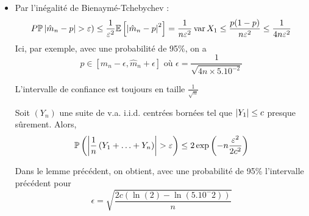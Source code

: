 \documentclass{cours}
\begin{document}
\begin{itemize}
    \item Par l'inégalité de Bienaymé-Tchebychev :
          \[
              P\mathbb{P}\left|\hat{m}_{n} - p\right| > \varepsilon) \leq \frac{1}{\varepsilon^{2}} \mathbb{E}\left[\left|\hat{m}_{n} - p\right|^{2}\right] = \frac{1}{n\varepsilon^{2}}\operatorname{var}{X_{1}}\leq \frac{p(1- p)}{n\varepsilon^{2}} \leq \frac{1}{4n\varepsilon^{2}}
          \]
          Ici, par exemple, avec une probabilité de 95\%, on a
          \[
              p \in \left[\hat{m}_{n} - \epsilon, \hat{m}_{n} + \epsilon\right] \text{ où } \epsilon = \frac{1}{\sqrt{4n \times 5.10^{-2}}}
          \]
          \begin{remark}
              L'intervalle de confiance est toujours en taille $\frac{1}{\sqrt{n}}$
          \end{remark}
          \begin{lemma}
              Soit $\left(Y_{n}\right)$ une suite de v.a. i.i.d. centrées bornées tel que $\left|Y_{1}\right| \leq c$ presque sûrement. Alors,
              \[
                  \mathbb{P}\left(\left|\frac{1}{n} \left(Y_{1} + \ldots + Y_{n}\right)\right| > \varepsilon\right) \leq 2\exp\left(-n\frac{\varepsilon^{2}}{2c^{2}}\right)
              \]
          \end{lemma}
          Dans le lemme précédent, on obtient, avec une probabilité de 95\% l'intervalle précédent pour
          \[
              \epsilon = \sqrt{\frac{2c\left(\ln(2) - \ln(5.10^-2)\right)}{n}}
          \]


\end{itemize}
\end{document}
